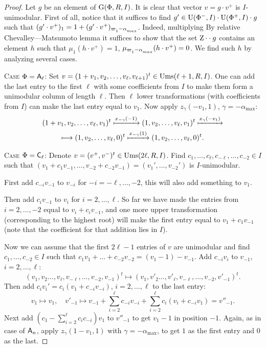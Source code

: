 \begin{proof}
Let $g$ be an element of $\operatorname{G}(\Phi, R, I)$. It is clear that vector $v=g\cdot v^+$ is $I$-unimodular.
First of all, notice that it suffices to find $g' \in \operatorname{U}(\Phi^-, I) \cdot \operatorname{U}(\Phi^+, I) \cdot g$ such that $(g'\cdot v^+)_{1} = 1 + (g'\cdot v^+)_{\varpi\ssub{1}-\alpha\ssub{max}}$.
Indeed, multiplying 
By relative Chevalley---Matsumoto lemma it suffices to show that the set $\operatorname{Z} \cdot  \cdot g$ contains an element $h$ such that
$\mu_1(h\cdot v^+)=1$, $\mu_{\varpi\ssub{1} - \alpha\ssub{max}}(h \cdot v^+)=0$.
We find such $h$ by analyzing several cases.

\textsc{Case $\Phi=\mathsf{A}_\ell$:}
Set $v=(1+v_1,v_2,\ldots,v_\ell,v_{\ell+1})^t\in\operatorname{Ums}(\ell+1,R,I)$.
One can add the last entry to the first $\ell$ with some coefficients from $I$ to make them form a unimodular column of length $\ell$.
Then $\ell$ lower transformations (with coefficients from $I$) can make the last entry equal to $v_1$.
Now apply $z_\gamma(-v_1,1)$, $\gamma=-\alpha_{\max}$:
\begin{multline*}
(1+v_1,v_2,\ldots,v_\ell,v_1)^t\xmapsto{x_{-\gamma}(-1)}(1,v_2,\ldots,v_\ell,v_1)^t\xmapsto{x_\gamma(-v_1)}\\\longmapsto(1,v_2,\ldots,v_\ell,0)^t\xmapsto{x_{-\gamma}(1)}(1,v_2,\ldots,v_\ell,0)^t.
\end{multline*}

\textsc{Case $\Phi=\mathsf{C}_\ell$:}
Denote $v=(v^+,v^-)^t\in\operatorname{Ums}(2\ell,R,I)$. 
Find $c_1,\ldots, c_\ell, c_{-\ell},\ldots, c_{-2}\in I$ such that $(v_1+c_1v_{-1},\ldots,v_{-2}+c_{-2}v_{-1})=(v_1',\ldots,v_{-2}')$ is $I$-unimodular.

First add $c_{-i}v_{-1}$ to $v_{-i}$ for $-i=-\ell,\ldots,-2$, this will also add something to $v_1$.

Then add $c_iv_{-1}$ to $v_i$ for $i=2,\ldots,\ell$. So far we have made the entries from $i=2,\ldots,-2$ equal to $v_i+c_iv_{-1}$, and one more upper transformation (corresponding to the highest root) will make the first entry equal to $v_1+c_1v_{-1}$ (note that the coefficient for that addition lies in $I$).

Now we can assume that the first $2\ell-1$ entries of $v$ are unimodular and find $c_1,\ldots,c_{-2}\in I$ such that $c_1v_1+\ldots+c_{-2}v_{-2}=(v_1-1)-v_{-1}$. Add $c_{-i}v_i$ to $v_{-1}$, $i=2,\ldots,\ell$:
\[ (v_1,v_2\ldots,v_\ell,v_{-\ell},\ldots,v_{-2},v_{-1})^t\longmapsto (v_1,v'_2\ldots,v'_\ell,v_{-\ell},\ldots,v_{-2},v'_{-1})^t. \]
Then add $c_iv_i'=c_i(v_1+c_{-i}v_{-i})$, $i=2,\ldots,\ell$ to the last entry:
\[ v_1\longmapsto v_1,\quad v'_{-1}\longmapsto v_{-1}+\sum_{i=2}^\ell c_{-i}v_{-i}+\sum_{i=2}^\ell c_i(v_i+c_{-i}v_1)=v''_{-1}. \]
Next add $\left(c_1-\sum_{i=2}^\ell c_ic_{-i}\right)v_1$ to $v''_{-1}$ to get $v_1-1$ in position $-1$.
Again, as in case of $\mathsf{A}_n$, apply $z_\gamma(1-v_1,1)$ with $\gamma=-\alpha_\mathrm{max}$, to get $1$ as the first entry and $0$ as the last.


\end{proof}
